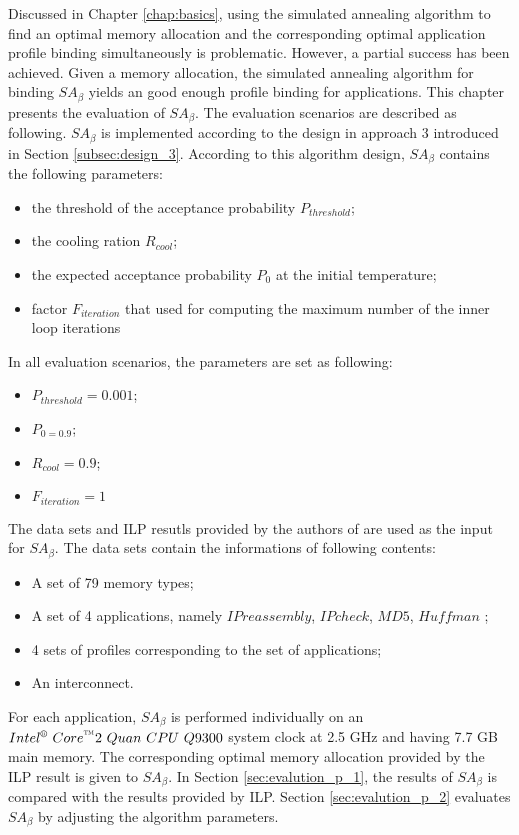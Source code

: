 \label{chap:evaluation}
Discussed in Chapter \ref{chap:basics}, using the simulated annealing algorithm to find
an optimal memory allocation and the corresponding optimal application profile binding
simultaneously is problematic.
However, a partial success has been achieved.
Given a memory allocation, the simulated annealing algorithm for binding $SA_{\beta}$
yields an good enough profile binding for applications.
This chapter presents the evaluation of $SA_{\beta}$.
The evaluation scenarios are described as following.
$SA_{\beta}$ is implemented according to the design in approach 3 introduced
in Section \ref{subsec:design_3}.
According to this algorithm design,
$SA_{\beta}$ contains the following parameters:
\begin{itemize}
	\item the threshold of the acceptance probability $P_{threshold}$;
	\item the cooling ration $R_{cool}$;
	\item the expected acceptance probability $P_{0}$ at the initial temperature;
	\item factor $F_{iteration}$ that used for computing the maximum number of
	the inner loop iterations
\end{itemize}
In all evaluation scenarios, the parameters are set as following:
\begin{itemize}
	\item $P_{threshold}=0.001$;
	\item $P_{0=0.9}$;
	\item $R_{cool} = 0.9$;
	\item $F_{iteration}=1$
\end{itemize}
The data sets and ILP resutls provided by the authors of \cite{Strobel2016}
are used as the input for $SA_{\beta}$.
The data sets contain the informations of following contents:
\begin{itemize}
	\item A set of 79 memory types;
	\item A set of 4 applications, namely $IP reassembly$, $IP check$, $MD5$, $Huffman$
		  \cite{Strobel2016};
	\item 4 sets of profiles corresponding to the set of applications;
	\item An interconnect.
\end{itemize}
For each application, $SA_{\beta}$ is performed individually on an
$Intel^{\text{\textregistered}} \text{ } Core^{\text{\texttrademark}}2 \text{ }
Quan \text{ } CPU \text{ } Q9300$ system
clock at 2.5 GHz and having 7.7 GB main memory. 
The corresponding optimal memory allocation provided by the ILP result is given
to $SA_{\beta}$.
In Section \ref{sec:evalution_p_1}, the results of $SA_{\beta}$ is compared with
the results provided by ILP.
Section \ref{sec:evalution_p_2} evaluates $SA_{\beta}$ by adjusting the algorithm
parameters.
